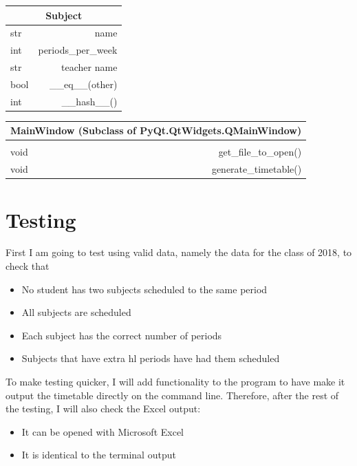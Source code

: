 \documentclass[12pt]{article}
\begin{document}
%
\begin{table}[H]
    \centering
\begin{tabular}{|l r|}
    \hline
    \multicolumn{2}{|c|}{Subject}\\
    \hline
    \hline
    str & name\\
    int & periods\_per\_week\\
    str & teacher name\\
    \hline
    bool & \_\_eq\_\_(other)\\
    int  & \_\_hash\_\_()\\
    \hline
\end{tabular}
\end{table}
%


%
\begin{table}[H]
    \centering
\begin{tabular}{|l r|}
    \hline
    \multicolumn{2}{|c|}{MainWindow (Subclass of PyQt.QtWidgets.QMainWindow)}\\
    \hline
    \hline              
    & \\[-0.5em]
    \hline
    void & get\_file\_to\_open()\\
    void & generate\_timetable()\\
    \hline
\end{tabular}
\end{table}
%

\section{Testing}

First I am going to test using valid data, namely the data for the class of 2018, to check
that
%
\begin{itemize}
    \item No student has two subjects scheduled to the same period
    \item All subjects are scheduled
    \item Each subject has the correct number of periods
    \item Subjects that have extra hl periods have had them scheduled
\end{itemize}
%

To make testing quicker, I will add functionality to the program to have make it output the
timetable directly on the command line. Therefore, after the rest of the testing, I will
also check the Excel output:
%
\begin{itemize}
    \item It can be opened with Microsoft Excel
    \item It is identical to the terminal output
\end{itemize}
%
\end{document}

